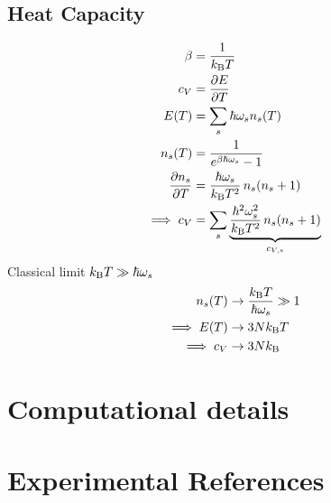 \newpage

\section{Heat Capacity}
\begin{subequations}
\begin{align}
	\beta
		& = \frac{1}{k_{\rm B} T} \\
	c_V 
		&= \frac{\partial E}{\partial T} \\
	E (T)
		&= \sum_s \hbar \omega_s n_s (T) \\
	n_s (T)
		&= \frac{1}{e^{\beta \hbar \omega_s} - 1} \\
	\frac{\partial n_s}{\partial T}
		&= \frac{\hbar \omega_s}{k_{\rm B} T^2} \, n_s (n_s + 1) \\
	\implies c_V
		&= \sum_s \underset{c_{V, s}}{\underbrace{\frac{\hbar^2 \omega_s^2}{k_{\rm B} T^2} \, n_s (n_s + 1)}}
\end{align}
\end{subequations}
Classical limit $k_{\rm B} T \gg \hbar \omega_s$
\begin{subequations}
\begin{align}
	n_s (T) 
		&\to \frac{k_{\rm B} T}{\hbar \omega_s} \gg 1 \\
	\implies E(T)
		&\to 3 N k_{\rm B} T \\
	\implies c_V 
		&\to 3 N k_{\rm B}
\end{align}
\end{subequations}

\chapter{Computational details}
\label{sec:app.computational_details}

\chapter{Experimental References}
\label{sec:app.experiments}

